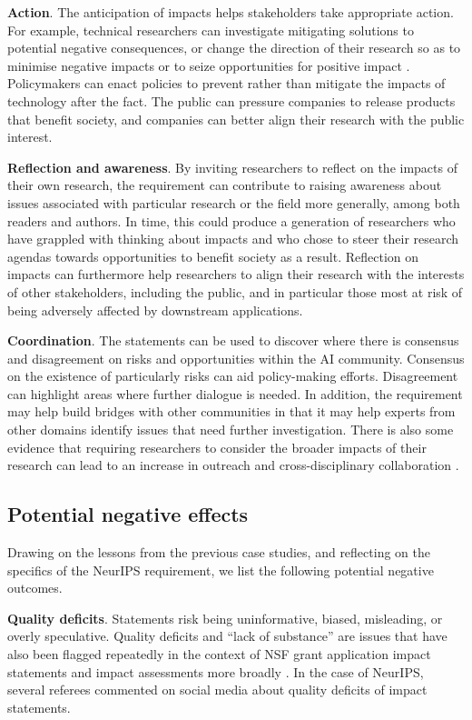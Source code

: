 \documentclass[11pt,english]{article}
\begin{document}
	\textbf{Action}. The anticipation of impacts helps stakeholders take appropriate action. For example, technical researchers can investigate mitigating solutions to potential negative consequences, or change the direction of their research so as to minimise negative impacts or to seize opportunities for positive impact \citep{hecht_its_2018}. Policymakers can enact policies to prevent rather than mitigate the impacts of technology after the fact. The public can pressure companies to release products that benefit society, and companies can better align their research with the public interest. 
	
	\textbf{Reflection and awareness}. By inviting researchers to reflect on the impacts of their own research, the requirement can contribute to raising awareness about issues associated with particular research or the field more generally, among both readers and authors. In time, this could produce a generation of researchers who have grappled with thinking about impacts and who chose to steer their research agendas towards opportunities to benefit society as a result. Reflection on impacts can furthermore help researchers to align their  research with the interests of other stakeholders, including the public, and in particular those most at risk of being adversely affected by downstream applications. 
	
	\textbf{Coordination}. The statements can be used to discover where there is consensus and disagreement on risks and opportunities within the AI community. Consensus on the existence of particularly risks can aid policy-making efforts. Disagreement can highlight areas where further dialogue is needed. In addition, the requirement may help build bridges with other communities in that it may help experts from other domains identify issues that need further investigation. There is also some evidence that requiring researchers to consider the broader impacts of their research can lead to an increase in outreach and cross-disciplinary collaboration \citep{owen_responsible_2010}.
	
	\subsection*{Potential negative effects}
	
	Drawing on the lessons from the previous case studies, and reflecting on the specifics of the NeurIPS requirement, we list the following potential negative outcomes.
	
	\textbf{Quality deficits}. Statements risk being uninformative, biased, misleading, or overly speculative. Quality deficits and ``lack of substance'' \citep[p.185]{bozeman_broad_2009} are issues that have also been flagged repeatedly in the context of NSF grant application impact statements and impact assessments more broadly \citep{frodeman_sciences_2007,gray_review_1999}. In the case of NeurIPS, several referees commented on social media about quality deficits of impact statements. 
	
\end{document}
